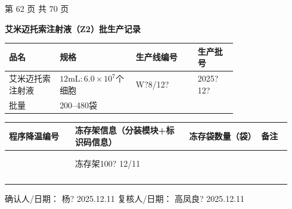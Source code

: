 \documentclass[UTF8,10pt,a4paper,fontset=fandol]{ctexart}
\newcommand{\fieldvalue}[1]{#1}
\newcommand{\handwritten}[1]{#1}
\begin{document}
\begin{center}
\scriptsize 第 62 页 共 70 页
\end{center}

\newpage

\begin{center}
\textbf{艾米迈托索注射液（Z2）批生产记录}

\vspace{0.3em}
\small
\begin{tabular}{|p{0.18\linewidth}|p{0.22\linewidth}|p{0.22\linewidth}|p{0.14\linewidth}|}
\hline
品名 & 规格 & 生产线编号 & 生产批号 \\ \hline
艾米迈托索注射液 & $12\mathrm{mL}:6.0\times10^{7}$个细胞 &
\fieldvalue{\handwritten{W?8/12?}} &
\fieldvalue{\handwritten{2025?12?}} \\ \hline
\multicolumn{1}{|p{0.18\linewidth}|}{批量} &
\multicolumn{3}{p{0.58\linewidth}|}{200--480袋} \\ \hline
\end{tabular}

\vspace{0.8em}

\begin{tabular}{|p{0.22\linewidth}|p{0.38\linewidth}|p{0.24\linewidth}|p{0.10\linewidth}|}
\hline
程序降温编号 &
冻存架信息（分装模块+标识码信息） &
冻存袋数量（袋） &
备注 \\ \hline
&
&
&
\\ \hline
&
&
&
\\ \hline
&
\fieldvalue{\handwritten{冻存架100? 12/11}} &
&
\\ \hline
&
&
&
\\ \hline
&
&
&
\\ \hline
&
&
&
\\ \hline
&
&
&
\\ \hline
\end{tabular}

\vspace{1em}

\noindent
确认人/日期：
\fieldvalue{\handwritten{杨?}}
\quad
\fieldvalue{\handwritten{2025.12.11}}
\hfill
复核人/日期：
\fieldvalue{\handwritten{高凤良?}}
\quad
\fieldvalue{\handwritten{2025.12.11}}
\end{center}
\end{document}
